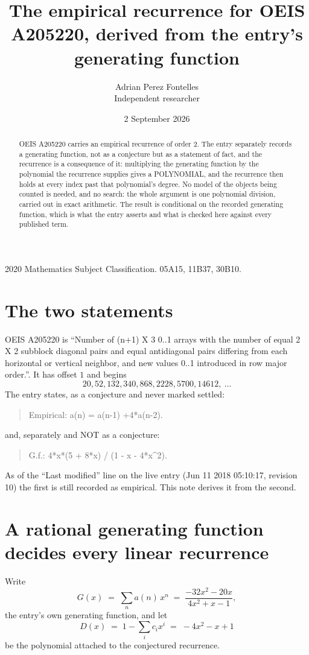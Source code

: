 \documentclass[11pt,a4paper]{article}
\title{The empirical recurrence for OEIS A205220, derived from the entry's generating function}
\author{Adrian Perez Fontelles\\ \small Independent researcher}
\date{2 September 2026}
\theoremstyle{plain}
\theoremstyle{definition}
\begin{document}
\maketitle

\begin{abstract}
OEIS A205220 carries an empirical recurrence of order $2$. The entry separately records a
generating function, not as a conjecture but as a statement of fact, and the recurrence is a
consequence of it: multiplying the generating function by the polynomial the recurrence
supplies gives a POLYNOMIAL, and the recurrence then holds at every index past that
polynomial's degree. No model of the objects being counted is needed, and no search: the
whole argument is one polynomial division, carried out in exact arithmetic. The result is
conditional on the recorded generating function, which is what the entry asserts and what is
checked here against every published term.
\end{abstract}

\noindent\small 2020 Mathematics Subject Classification. 05A15, 11B37, 30B10.\normalsize

\section{The two statements}

OEIS A205220 is ``Number of (n+1) X 3 0..1 arrays with the number of equal 2 X 2 subblock diagonal pairs and equal antidiagonal pairs differing from each horizontal or vertical neighbor, and new values 0..1 introduced in row major order.''. It has offset $1$ and begins
\[
20, 52, 132, 340, 868, 2228, 5700, 14612,\ \dots
\]
The entry states, as a conjecture and never marked settled:
\begin{quote}
Empirical: a(n) = a(n-1) +4*a(n-2).
\end{quote}
and, separately and NOT as a conjecture:
\begin{quote}
G.f.: 4*x*(5 + 8*x) / (1 - x - 4*x\^{}2).
\end{quote}
As of the ``Last modified'' line on the live entry (Jun 11 2018 05:10:17, revision 10) the first is still
recorded as empirical. This note derives it from the second.

\section{A rational generating function decides every linear recurrence}

Write
\[
G(x)\;=\;\sum_{n}a(n)\,x^{n}\;=\;\frac{- 32 x^{2} - 20 x}{4 x^{2} + x - 1},
\]
the entry's own generating function, and let
\[
D(x)\;=\;1-\sum_i c_i x^{i}\;=\;- 4 x^{2} - x + 1
\]
be the polynomial attached to the conjectured recurrence.
\end{document}
